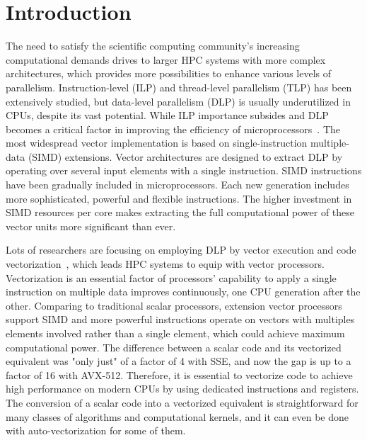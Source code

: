 \documentclass[sigconf]{acmart}
\begin{document}
\section{Introduction}\label{sec:intro}
The need to satisfy the scientific computing community's increasing
computational demands drives to larger HPC systems with more complex architectures,
which provides more possibilities to enhance various levels of parallelism.
%
Instruction-level (ILP) and thread-level parallelism (TLP) has been extensively
studied, but data-level parallelism (DLP) is usually underutilized in CPUs, despite its vast potential.
While ILP importance subsides and DLP becomes a critical
factor in improving the efficiency of
microprocessors~\cite{energy_effects, AVX_extensions, Hardware_Events, espasa1998vector, Watson1972TheTA, cluster_efficiency}.
The most widespread vector implementation is based on single-instruction multiple-data (SIMD) extensions.
Vector architectures are designed to extract DLP by operating over several input elements with a single instruction.
SIMD instructions have been gradually included in
microprocessors. Each new generation includes more sophisticated, powerful and flexible
instructions. The higher investment in SIMD resources per core makes extracting the
full computational power of these vector units more significant than ever.

Lots of researchers are focusing on employing DLP by vector
execution and code vectorization~\cite{Vectorizing_Compilers1,Vectorizing-Compilers,vectorize_11,vectorizingcompilers,SIMD_Vector_Operations}, which leads HPC
systems to equip with vector processors.
Vectorization is an essential factor of processors' capability to apply
a single instruction on multiple data improves
continuously, one CPU generation after the other.
Comparing to traditional scalar processors, extension vector processors support
SIMD and more powerful instructions operate
on vectors with multiples elements involved rather than a single element, which
could achieve maximum computational power.
The difference between a scalar code and its vectorized equivalent
was "only just" of a factor of 4 with SSE, and now the
gap is up to a factor of 16 with AVX-512. Therefore, it is essential to
vectorize code to achieve high performance on modern CPUs by using dedicated instructions
and registers. The conversion of a scalar code into a vectorized
equivalent is straightforward for many classes of algorithms
and computational kernels, and it can even be done with auto-vectorization for some of them.
%
\end{document}
